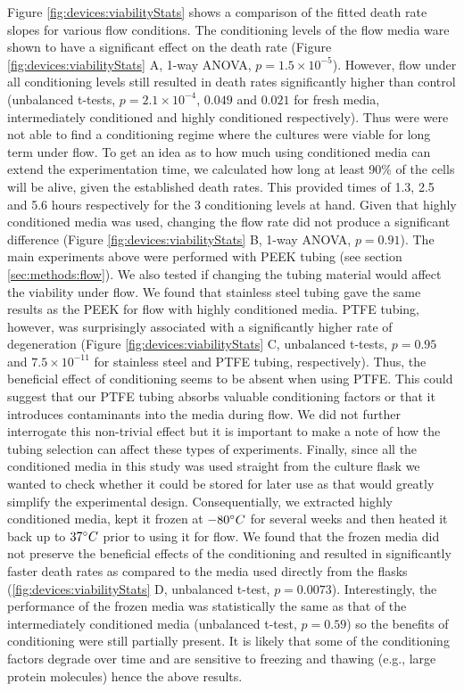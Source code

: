     Figure \ref{fig:devices:viabilityStats} shows a comparison of the fitted death rate slopes for various flow conditions. The conditioning levels of the flow media ware shown to have a significant effect on the death rate (Figure \ref{fig:devices:viabilityStats} A, 1-way ANOVA, \(p=1.5\times 10^{-5}\)). However, flow under all conditioning levels still resulted in death rates significantly higher than control (unbalanced t-tests, \(p=2.1\times 10^{-4}\), \(0.049\) and \(0.021\) for fresh media, intermediately conditioned and highly conditioned respectively). Thus were were not able to find a conditioning regime where the cultures were viable for long term under flow. To get an idea as to how much using conditioned media can extend the experimentation time, we calculated how long at least 90\% of the cells will be alive, given the established death rates. This provided times of 1.3, 2.5 and 5.6 hours respectively for the 3 conditioning levels at hand. Given that highly conditioned media was used, changing the flow rate did not produce a significant difference (Figure \ref{fig:devices:viabilityStats} B, 1-way ANOVA, \(p=0.91\)). The main experiments above were performed with PEEK tubing (see section \ref{sec:methods:flow}). We also tested if changing the tubing material would affect the viability under flow. We found that stainless steel tubing gave the same results as the PEEK for flow with highly conditioned media. PTFE tubing, however, was surprisingly associated with a significantly higher rate of degeneration (Figure \ref{fig:devices:viabilityStats} C, unbalanced t-tests, \(p=0.95\) and \(7.5\times 10^{-11}\) for stainless steel and PTFE tubing, respectively). Thus, the beneficial effect of conditioning seems to be absent when using PTFE. This could suggest that our PTFE tubing absorbs valuable conditioning factors or that it introduces contaminants into the media during flow. We did not further interrogate this non-trivial effect but it is important to make a note of how the tubing selection can affect these types of experiments. Finally, since all the conditioned media in this study was used straight from the culture flask we wanted to check whether it could be stored for later use as that would greatly simplify the experimental design. Consequentially, we extracted highly conditioned media, kept it frozen at \(-80\degree C\) for several weeks and then heated it back up to \(37\degree C\) prior to using it for flow. We found that the frozen media did not preserve the beneficial effects of the conditioning and resulted in significantly faster death rates as compared to the media used directly from the flasks (\ref{fig:devices:viabilityStats} D, unbalanced t-test, \(p=0.0073\)). Interestingly, the performance of the frozen media was statistically the same as that of the intermediately conditioned media (unbalanced t-test, \(p=0.59\)) so the benefits of conditioning were still partially present. It is likely that some of the conditioning factors degrade over time and are sensitive to freezing and thawing (e.g., large protein molecules) hence the above results.


